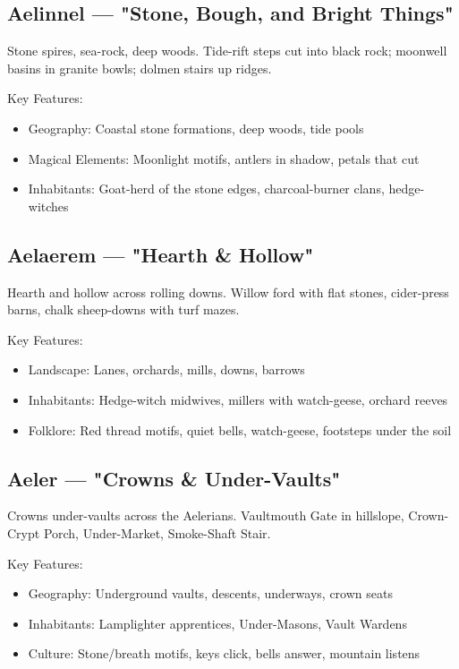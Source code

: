 \subsection{Aelinnel — "Stone, Bough, and Bright Things"}
\label{sec:aelinnel}

Stone spires, sea-rock, deep woods. Tide-rift steps cut into black rock; moonwell basins in granite bowls; dolmen stairs up ridges.

Key Features:
\begin{itemize}
    \item Geography: Coastal stone formations, deep woods, tide pools
    \item Magical Elements: Moonlight motifs, antlers in shadow, petals that cut
    \item Inhabitants: Goat-herd of the stone edges, charcoal-burner clans, hedge-witches
\end{itemize}

\subsection{Aelaerem — "Hearth \& Hollow"}
\label{sec:aelaerem}

Hearth and hollow across rolling downs. Willow ford with flat stones, cider-press barns, chalk sheep-downs with turf mazes.

Key Features:
\begin{itemize}
    \item Landscape: Lanes, orchards, mills, downs, barrows
    \item Inhabitants: Hedge-witch midwives, millers with watch-geese, orchard reeves
    \item Folklore: Red thread motifs, quiet bells, watch-geese, footsteps under the soil
\end{itemize}

\subsection{Aeler — "Crowns \& Under-Vaults"}
\label{sec:aeler}

Crowns under-vaults across the Aelerians. Vaultmouth Gate in hillslope, Crown-Crypt Porch, Under-Market, Smoke-Shaft Stair.

Key Features:
\begin{itemize}
    \item Geography: Underground vaults, descents, underways, crown seats
    \item Inhabitants: Lamplighter apprentices, Under-Masons, Vault Wardens
    \item Culture: Stone/breath motifs, keys click, bells answer, mountain listens
\end{itemize}


